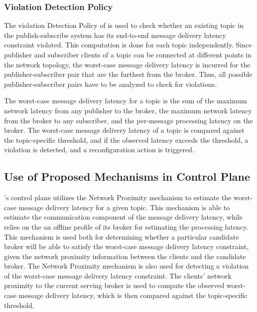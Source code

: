 \subsubsection{Violation Detection Policy}
The violation Detection Policy of \epulsar{} is used to check whether an existing topic in the publish-subscribe system has its end-to-end message delivery latency constraint violated. This computation is done for each topic independently. Since publisher and subscriber clients of a topic can be connected at different points in the network topology, the worst-case message delivery latency is incurred for the publisher-subscriber pair that are the furthest from the broker. Thus, all possible publisher-subscriber pairs have to be analyzed to check for violations.
\par The worst-case message delivery latency for a topic is the sum of the maximum network latency from any publisher to the broker, the maximum network latency from the broker to any subscriber, and the per-message processing latency on the broker. The worst-case message delivery latency of a topic is compared against the topic-specific threshold, and if the observed latency exceeds the threshold, a violation is detected, and a reconfiguration action is triggered.
\subsection{Use of Proposed Mechanisms in Control Plane}
\epulsar{}'s control plane utilizes the Network Proximity mechanism to estimate the worst-case message delivery latency for a given topic. This mechanism is able to estimate the communication component of the message delivery latency, while \epulsar{} relies on the an offline profile of its broker for estimating the processing latency. This mechanism is used both for determining whether a particular candidate broker will be able to satisfy the worst-case message delivery latency constraint, given the network proximity information between the clients and the candidate broker. The Network Proximity mechanism is also used for detecting a violation of the worst-case message delivery latency constraint. The clients' network proximity to the current serving broker is used to compute the observed worst-case message delivery latency, which is then compared against the topic-specific threshold.
